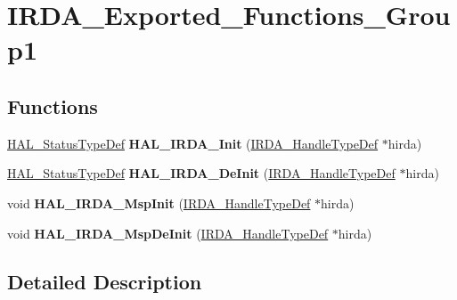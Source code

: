 \hypertarget{group___i_r_d_a___exported___functions___group1}{}\section{I\+R\+D\+A\+\_\+\+Exported\+\_\+\+Functions\+\_\+\+Group1}
\label{group___i_r_d_a___exported___functions___group1}
\subsection*{Functions}
\begin{DoxyCompactItemize}
\item 
\hyperlink{stm32f4xx__hal__def_8h_a63c0679d1cb8b8c684fbb0632743478f}{H\+A\+L\+\_\+\+Status\+Type\+Def} {\bfseries H\+A\+L\+\_\+\+I\+R\+D\+A\+\_\+\+Init} (\hyperlink{struct_i_r_d_a___handle_type_def}{I\+R\+D\+A\+\_\+\+Handle\+Type\+Def} $\ast$hirda)\hypertarget{group___i_r_d_a___exported___functions___group1_ga4a41c32a70503a33c238511e3a402aa6}{}\label{group___i_r_d_a___exported___functions___group1_ga4a41c32a70503a33c238511e3a402aa6}

\item 
\hyperlink{stm32f4xx__hal__def_8h_a63c0679d1cb8b8c684fbb0632743478f}{H\+A\+L\+\_\+\+Status\+Type\+Def} {\bfseries H\+A\+L\+\_\+\+I\+R\+D\+A\+\_\+\+De\+Init} (\hyperlink{struct_i_r_d_a___handle_type_def}{I\+R\+D\+A\+\_\+\+Handle\+Type\+Def} $\ast$hirda)\hypertarget{group___i_r_d_a___exported___functions___group1_ga2fc5f408dc349561f0a685144813ea77}{}\label{group___i_r_d_a___exported___functions___group1_ga2fc5f408dc349561f0a685144813ea77}

\item 
void {\bfseries H\+A\+L\+\_\+\+I\+R\+D\+A\+\_\+\+Msp\+Init} (\hyperlink{struct_i_r_d_a___handle_type_def}{I\+R\+D\+A\+\_\+\+Handle\+Type\+Def} $\ast$hirda)\hypertarget{group___i_r_d_a___exported___functions___group1_ga76075c1def7959ef153a0cdeb564ee0d}{}\label{group___i_r_d_a___exported___functions___group1_ga76075c1def7959ef153a0cdeb564ee0d}

\item 
void {\bfseries H\+A\+L\+\_\+\+I\+R\+D\+A\+\_\+\+Msp\+De\+Init} (\hyperlink{struct_i_r_d_a___handle_type_def}{I\+R\+D\+A\+\_\+\+Handle\+Type\+Def} $\ast$hirda)\hypertarget{group___i_r_d_a___exported___functions___group1_ga1f75d9b05cc84c2ca82a5f453942ab7f}{}\label{group___i_r_d_a___exported___functions___group1_ga1f75d9b05cc84c2ca82a5f453942ab7f}

\end{DoxyCompactItemize}


\subsection{Detailed Description}
